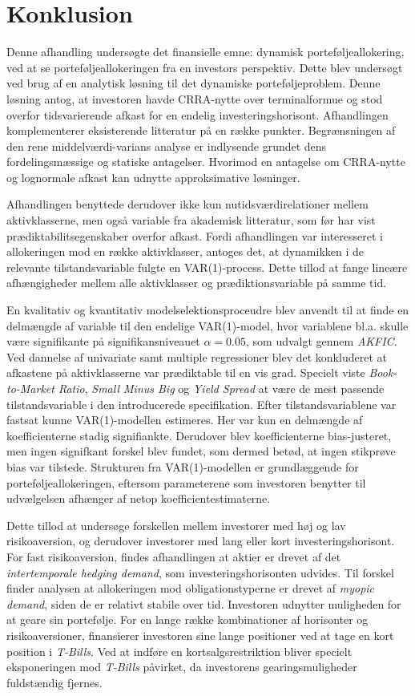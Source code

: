 \documentclass[
  a4paper,
  oneside]{memoir}
\begin{document}
\hypertarget{konklu}{%
\chapter{Konklusion}\label{konklu}}

Denne afhandling undersøgte det finansielle emne: dynamisk porteføljeallokering, ved at se porteføljeallokeringen fra en investors perspektiv. Dette blev undersøgt ved brug af en analytisk løsning til det dynamiske porteføljeproblem. Denne løsning antog, at investoren havde CRRA-nytte over terminalformue og stod overfor tidsvarierende afkast for en endelig investeringshorisont. Afhandlingen komplementerer eksisterende litteratur på en række punkter. Begrænsningen af den rene middelværdi-varians analyse er indlysende grundet dens fordelingsmæssige og statiske antagelser. Hvorimod en antagelse om CRRA-nytte og lognormale afkast kan udnytte approksimative løsninger.

Afhandlingen benyttede derudover ikke kun nutidsværdirelationer mellem aktivklasserne, men også variable fra akademisk litteratur, som før har vist prædiktabilitsegenskaber overfor afkast. Fordi afhandlingen var interesseret i allokeringen mod en række aktivklasser, antoges det, at dynamikken i de relevante tilstandsvariable fulgte en VAR(1)-process. Dette tillod at fange lineære afhængigheder mellem alle aktivklasser og prædiktionsvariable på samme tid.

En kvalitativ og kvantitativ modelselektionsproceudre blev anvendt til at finde en delmængde af variable til den endelige VAR(1)-model, hvor variablene bl.a. skulle være signifikante på signifikansniveauet \(\alpha=0.05\), som udvalgt gennem \emph{AKFIC}. Ved dannelse af univariate samt multiple regressioner blev det konkluderet at afkastene på aktivklasserne var prædiktable til en vis grad. Specielt viste \emph{Book-to-Market Ratio}, \emph{Small Minus Big} og \emph{Yield Spread} at være de mest passende tilstandsvariable i den introducerede specifikation. Efter tilstandsvariablene var fastsat kunne VAR(1)-modellen estimeres. Her var kun en delmængde af koefficienterne stadig signifiankte. Derudover blev koefficienterne bias-justeret, men ingen signifkant forskel blev fundet, som dermed betød, at ingen stikprøve bias var tilstede. Strukturen fra VAR(1)-modellen er grundlæggende for porteføljeallokeringen, eftersom parameterene som investoren benytter til udvælgelsen afhænger af netop koefficientestimaterne.

Dette tillod at undersøge forskellen mellem investorer med høj og lav risikoaversion, og derudover investorer med lang eller kort investeringshorisont. For fast risikoaversion, findes afhandlingen at aktier er drevet af det \emph{intertemporale hedging demand}, som investeringshorisonten udvides. Til forskel finder analysen at allokeringen mod obligationstyperne er drevet af \emph{myopic demand}, siden de er relativt stabile over tid. Investoren udnytter muligheden for at geare sin portefølje. For en lange række kombinationer af horisonter og risikoaversioner, finansierer investoren sine lange positioner ved at tage en kort position i \emph{T-Bills}. Ved at indføre en kortsalgsrestriktion bliver specielt eksponeringen mod \emph{T-Bills} påvirket, da investorens gearingsmuligheder fuldstændig fjernes.
\end{document}
